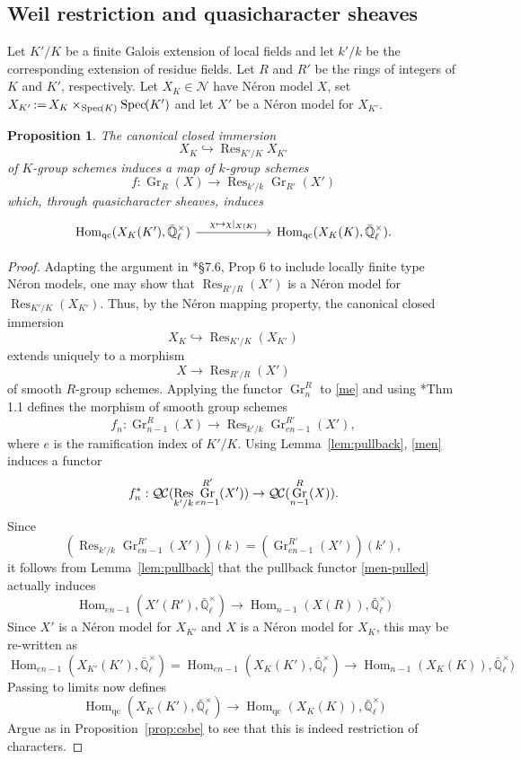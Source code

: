 \documentclass[10pt]{amsart}
\theoremstyle{plain}
\newtheorem{proposition}[theorem]{Proposition}
\theoremstyle{definition}
\theoremstyle{remark}
\newcommand{\EE}{\mathbb{\bar Q}_\ell}
\newcommand{\Fq}{k}
\newcommand{\EEx}{\EE^\times}
\DeclareMathOperator{\Hom}{Hom}
\DeclareMathOperator{\Gr}{Gr}
\DeclareMathOperator{\Res}{Res}
\newcommand{\Spec}[1]{{\operatorname{Spec}\hskip-1pt( #1 )}}
\newcommand{\ceq}{{\, :=\, }}
\newcommand{\QC}{{\mathcal{Q\hskip-0.8pt C}}}
\begin{document}
\subsection{Weil restriction and quasicharacter sheaves}\label{ssec:wrK}

Let $K'/K$ be a finite Galois extension of local fields and
let $k'/k$ be the corresponding extension of residue fields.
Let $R$ and $R'$ be the rings of integers of $K$ and $K'$, respectively.
Let $X_K \in \mathcal{N}$ have N\'eron model $X$, set $X_{K'} \ceq X_K \times_\Spec{K} \Spec{K'}$
and let $X'$ be a N\'eron model for $X_{K'}$.

\begin{proposition}\label{prop:wrK}
The canonical closed immersion 
\[
X_K \hookrightarrow \Res_{K'/K} X_{K'}
\]
of $K$-group schemes
induces a map of $\Fq$-group schemes 
\[
f : \Gr_R(X) \to \Res_{k'/k} \Gr_{R'}(X')
\] 
which, through quasicharacter sheaves, induces
\[
\begin{tikzcd}[column sep=60]
\Hom_{\text{qc}}(X_K(K'), \EEx) \arrow{r}{\chi \mapsto \chi\vert_{X(K)}} &\Hom_{\text{qc}}(X_K(K), \EEx).
\end{tikzcd}
\]
\end{proposition}

\begin{proof}
Adapting the argument in \cite{bosch-lutkebohmert-reynaud:NeronModels}*{\S 7.6, Prop 6} to include locally finite type N\'eron models,
one may show that $\Res_{R'/R}(X')$ is a N\'eron model for $\Res_{K'/K}(X_{K'})$.
Thus, by the N\'eron mapping property, the canonical closed immersion
\[
X_K\hookrightarrow \Res_{K'/K}(X_{K'})
\]
 extends uniquely to a morphism
\begin{equation}\label{me}
X\to \Res_{R'/R}(X')
\end{equation}
 of smooth $R$-group schemes.
%
Applying the functor $\Gr^R_{n}$ to \eqref{me}
and using \cite{bertrapelle-gonzales:Greenberg}*{Thm 1.1} defines the morphism of smooth group schemes
\begin{equation}\label{men}
f_n: \Gr_{n-1}^R(X) \to \Res_{k'/k} \Gr_{en-1}^{R'}(X'),
\end{equation}
where $e$ is the ramification index of $K'/K$.
Using Lemma~\ref{lem:pullback}, \eqref{men} induces a functor 
\begin{equation}\label{men-pulled}
f_n^* : \QC(\Res_{k'/k} \Gr_{en-1}^{R'}(X'))\to \QC(\Gr_{n-1}^{R}(X)).
\end{equation}
Since 
\[
\left(\Res_{k'/k} \Gr_{en-1}^{R'}(X') \right)(\Fq) = \left(\Gr_{en-1}^{R'}(X')\right)(k'),
\]
it follows from Lemma~\ref{lem:pullback} that the pullback functor \eqref{men-pulled} actually induces
\[ 
\Hom_{en-1}(X'(R'),\EEx) \to \Hom_{n-1}(X(R)),\EEx)
\]
Since $X'$ is a N\'eron model for $X_{K'}$ and $X$ is a N\'eron model for $X_K$,
 this may be re-written as
 \[ 
\Hom_{en-1}(X_{K'}(K'),\EEx)= \Hom_{en-1}(X_{K}(K'),\EEx) \to \Hom_{n-1}(X_K(K)),\EEx)
\]
Passing to limits now defines
\[ 
\Hom_\text{qc}(X_K(K'),\EEx) \to \Hom_\text{qc}(X_K(K)),\EEx)
\]
Argue as in Proposition~\ref{prop:csbe} to see that this is indeed restriction of characters.
\end{proof}
\end{document}
